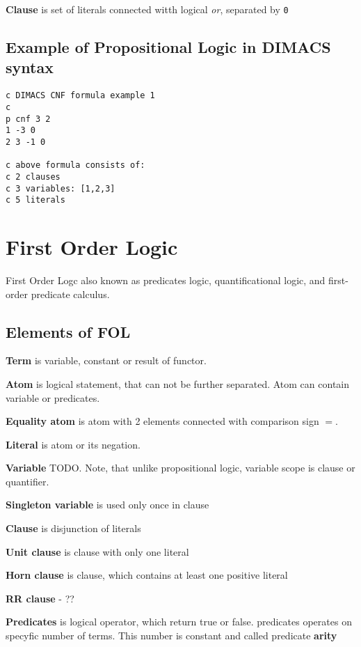 \textbf{Clause} is set of literals connected witth logical \textit{or}, separated by \texttt{0}

\subsection{Example of Propositional Logic in DIMACS syntax}

\begin{verbatim}
c DIMACS CNF formula example 1
c
p cnf 3 2
1 -3 0
2 3 -1 0

c above formula consists of:
c 2 clauses
c 3 variables: [1,2,3]
c 5 literals
\end{verbatim}


\section{First Order Logic}

First Order Logc also known as predicates logic, quantificational logic, and first-order predicate calculus.

\subsection{Elements of FOL}

\textbf{Term}
is variable, constant or result of functor.

\textbf{Atom}
is logical statement, that can not be further separated. Atom can contain variable or predicates.

\textbf{Equality atom}
is atom with 2 elements connected with comparison sign $=$.

\textbf{Literal}
is atom or its negation.

\textbf{Variable}
TODO. Note, that unlike propositional logic, variable scope is clause or quantifier.

\textbf{Singleton variable}
is used only once in clause

\textbf{Clause}
is disjunction of literals

\textbf{Unit clause}
is clause with only one literal

\textbf{Horn clause}
is clause, which contains at least one positive literal

\textbf{RR clause} - ??

\textbf{Predicates}
is logical operator, which return true or false. predicates operates on specyfic number of terms. This number is constant and called predicate \textbf{arity}

